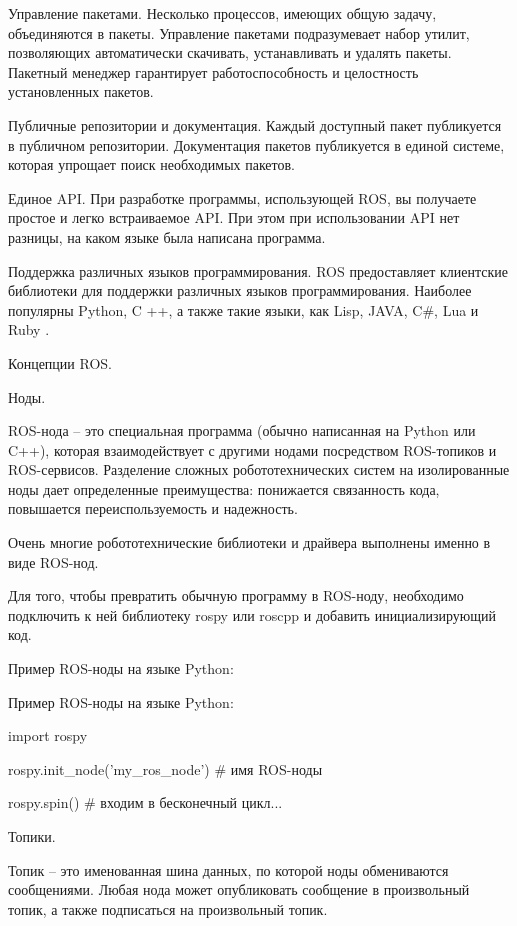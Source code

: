 Управление пакетами. Несколько процессов, имеющих общую задачу, объединяются в пакеты. Управление пакетами подразумевает набор утилит, позволяющих автоматически скачивать, устанавливать и удалять пакеты. Пакетный менеджер гарантирует работоспособность и целостность установленных пакетов.

Публичные репозитории и документация. Каждый доступный пакет публикуется в публичном репозитории. Документация пакетов публикуется в единой системе, которая упрощает поиск необходимых пакетов.

Единое API. При разработке программы, использующей ROS, вы получаете простое и легко встраиваемое API. При этом при использовании API нет разницы, на каком языке была написана программа.

Поддержка различных языков программирования. ROS предоставляет клиентские библиотеки для поддержки различных языков программирования. Наиболее популярны Python, C ++, а также такие языки, как Lisp, JAVA, C\#, Lua и Ruby \cite{voltbro}.


Концепции ROS.

Ноды.

ROS-нода – это специальная программа (обычно написанная на Python или C++), которая взаимодействует с другими нодами посредством ROS-топиков и ROS-сервисов. Разделение сложных робототехнических систем на изолированные ноды дает определенные преимущества: понижается связанность кода, повышается переиспользуемость и надежность.

Очень многие робототехнические библиотеки и драйвера выполнены именно в виде ROS-нод.

Для того, чтобы превратить обычную программу в ROS-ноду, необходимо подключить к ней библиотеку rospy или roscpp и добавить инициализирующий код.

Пример ROS-ноды на языке Python:

\begin{Program}[H]
	\caption{Пример ROS-ноды на языке Python:} \label{lst:1}
	\begin{MyCode}
import rospy

rospy.init\_node('my\_ros\_node')  # имя ROS-ноды

rospy.spin()  # входим в бесконечный цикл...
	\end{MyCode}
\end{Program}
Топики.

Топик – это именованная шина данных, по которой ноды обмениваются сообщениями. Любая нода может опубликовать сообщение в произвольный топик, а также подписаться на произвольный топик.

